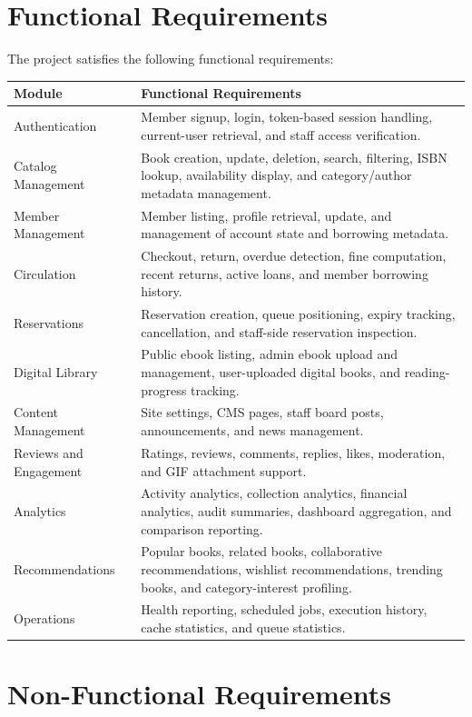 \documentclass[12pt,a4paper]{report}
\begin{document}
\section{Functional Requirements}
The project satisfies the following functional requirements:
\begin{longtable}{p{} p{}}
\toprule
\textbf{Module} & \textbf{Functional Requirements} \\
\midrule
\endhead
Authentication & Member signup, login, token-based session handling, current-user retrieval, and staff access verification. \\
Catalog Management & Book creation, update, deletion, search, filtering, ISBN lookup, availability display, and category/author metadata management. \\
Member Management & Member listing, profile retrieval, update, and management of account state and borrowing metadata. \\
Circulation & Checkout, return, overdue detection, fine computation, recent returns, active loans, and member borrowing history. \\
Reservations & Reservation creation, queue positioning, expiry tracking, cancellation, and staff-side reservation inspection. \\
Digital Library & Public ebook listing, admin ebook upload and management, user-uploaded digital books, and reading-progress tracking. \\
Content Management & Site settings, CMS pages, staff board posts, announcements, and news management. \\
Reviews and Engagement & Ratings, reviews, comments, replies, likes, moderation, and GIF attachment support. \\
Analytics & Activity analytics, collection analytics, financial analytics, audit summaries, dashboard aggregation, and comparison reporting. \\
Recommendations & Popular books, related books, collaborative recommendations, wishlist recommendations, trending books, and category-interest profiling. \\
Operations & Health reporting, scheduled jobs, execution history, cache statistics, and queue statistics. \\
\bottomrule
\end{longtable}

\section{Non-Functional Requirements}
\end{document}
